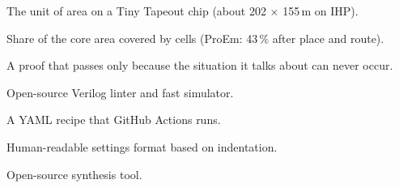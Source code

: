 \documentclass[11pt,a4paper]{article}
\begin{document}
\begin{description}[style=nextline,leftmargin=1.5em]
\item[Tile] The unit of area on a Tiny Tapeout chip (about 202 $\times$ 155\,\textmu m on IHP).
\item[Utilisation] Share of the core area covered by cells (ProEm: 43\,\% after place and route).
\item[Vacuous proof] A proof that passes only because the situation it talks about can never occur.
\item[Verilator] Open-source Verilog linter and fast simulator.
\item[Workflow] A YAML recipe that GitHub Actions runs.
\item[YAML] Human-readable settings format based on indentation.
\item[Yosys] Open-source synthesis tool.
\end{description}
\end{document}
